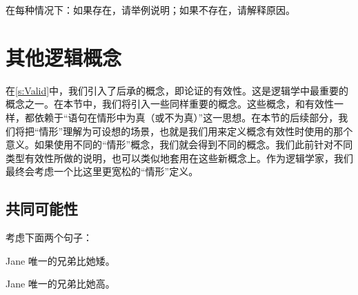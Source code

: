 在每种情况下：如果存在，请举例说明；如果不存在，请解释原因。

\chapter{其他逻辑概念}\label{s:BasicNotions}

在\cref{s:Valid}中，我们引入了后承的概念，即论证的有效性。这是逻辑学中最重要的概念之一。在本节中，我们将引入一些同样重要的概念。这些概念，和有效性一样，都依赖于“语句在情形中为真（或不为真）”这一思想。在本节的后续部分，我们将把“情形”理解为可设想的场景，也就是我们用来定义概念有效性时使用的那个意义。如果使用不同的“情形”概念，我们就会得到不同的概念。我们此前针对不同类型有效性所做的说明，也可以类似地套用在这些新概念上。作为逻辑学家，我们最终会考虑一个比这里更宽松的“情形”定义。



\section{共同可能性}

考虑下面两个句子：


\begin{compactlist}
		\item[B1.] Jane 唯一的兄弟比她矮。
		\item[B2.] Jane 唯一的兄弟比她高。
	\end{compactlist}


